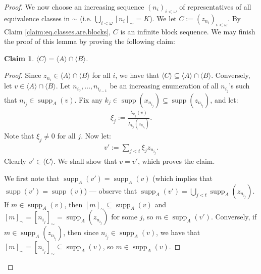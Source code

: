 \documentclass[10pt,a4paper]{amsart}
\theoremstyle{plain}
\numberwithin{equation}{section}
\newtheorem{claim}{Claim}
\theoremstyle{definition}
\newcommand{\func}{\operatorname}
\renewcommand{\c}[1]{\langle #1 \rangle}
\newcommand{\supp}{\func{supp}}
\newenvironment{midproof}[1][Proof]
  {\begin{proof}[#1]\renewcommand{\qedsymbol}{$\blacksquare$}}
  {\end{proof}}
\begin{document}
\begin{proof}
    We now choose an increasing sequence $(n_i)_{i<\omega}$ of representatives of all equivalence classes in $\sim$ (i.e. $\bigcup_{i<\omega} [n_i]_\sim = K$). We let $C := (z_{n_i})_{i<\omega}$. By Claim \ref{claim:eq.classes.are.blocks}, $C$ is an infinite block sequence. We may finish the proof of this lemma by proving the following claim:

    \begin{claim}
        $\c{C} = \c{A} \cap \c{B}$.
    \end{claim}

    \begin{midproof}
        Since $z_{n_i} \in \c{A} \cap \c{B}$ for all $i$, we have that $\c{C} \subseteq \c{A} \cap \c{B}$. Conversely, let $v \in \c{A} \cap \c{B}$. Let $n_{i_0},\dots,n_{i_{t-1}}$ be an increasing enumeration of all $n_{i_j}$'s such that $n_{i_j} \in \supp_A(v)$. Fix any $k_j \in \supp(x_{n_{i_j}}) \subseteq \supp(z_{n_{i_j}})$, and let:
        \begin{align*}
            \xi_j := \frac{\lambda_{k_j}(v)}{\lambda_{k_j}(z_{n_{i_j}})}.
        \end{align*}
        Note that $\xi_j \neq 0$ for all $j$. Now let:
        \begin{align*}
            v' := \sum_{j<t} \xi_jz_{n_{i_j}}.
        \end{align*}
        Clearly $v' \in \c{C}$. We shall show that $v = v'$, which proves the claim.

        We first note that $\supp_A(v') = \supp_A(v)$ (which implies that $\supp(v') = \supp(v)$) --- observe that $\supp_A(v') = \bigcup_{j<t} \supp_A(z_{n_{i_j}})$. If $m \in \supp_A(v)$, then $[m]_\sim \subseteq \supp_A(v)$ and $[m]_\sim = [n_{i_j}]_\sim = \supp_A(z_{n_{i_j}})$ for some $j$, so $m \in \supp_A(v')$. Conversely, if $m \in \supp_A(z_{n_{i_j}})$, then since $n_{i_j} \in \supp_A(v)$, we have that $[m]_\sim = [n_{i_j}]_\sim \subseteq \supp_A(v)$, so $m \in \supp_A(v)$. 


\end{midproof}
\end{proof}
\end{document}
